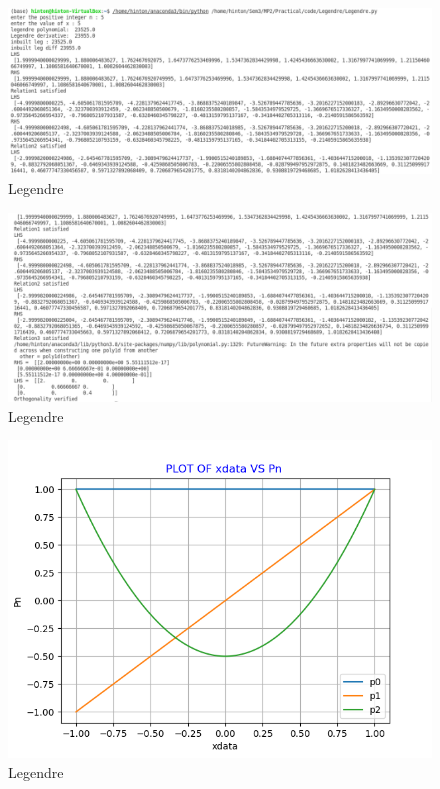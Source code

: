 \documentclass{article}
\begin{document}
\begin{figure}[h]
    \centering
    \includegraphics[width=16cm,height=7cm \textwidth]{Legendre/3.PNG}
\caption{Legendre}
\end{figure}
\begin{figure}[h]
    \centering
    \includegraphics[width=16cm,height=7cm \textwidth]{Legendre/4.PNG}
\caption{Legendre}
\end{figure}
\clearpage
\begin{figure}[h]
    \centering
    \includegraphics[width=12cm,height=10cm \textwidth]{Legendre/Figure_1.png}
\caption{Legendre}
\end{figure}
\end{document}
